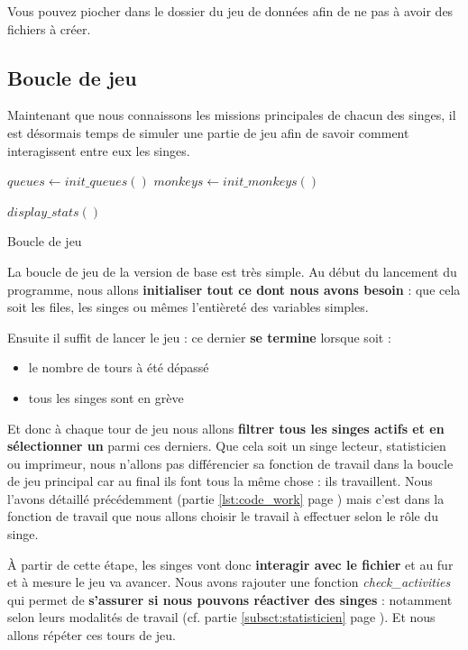 \documentclass{article}
\begin{document}
Vous pouvez piocher dans le dossier du jeu de données  afin de ne pas à avoir des fichiers à créer.


\subsection{Boucle de jeu}
\label{subsct:boucle_jeu}

Maintenant que nous connaissons les missions principales de chacun des singes, il est désormais temps de simuler une partie de jeu afin de savoir comment interagissent entre eux les singes.

\begin{algorithm}[H]
$queues \gets init\_queues()$\;
$monkeys \gets init\_monkeys()$\;

$display\_stats()$\;
\caption{Boucle de jeu}
\end{algorithm}
\label{algo:game}

La boucle de jeu de la version de base est très simple. Au début du lancement du programme, nous allons \textbf{initialiser tout ce dont nous avons besoin} : que cela soit les files, les singes ou mêmes l'entièreté des variables simples.

Ensuite il suffit de lancer le jeu : ce dernier \textbf{se termine} lorsque soit :
\begin{itemize}
    \item le nombre de tours à été dépassé
    \item tous les singes sont en grève
\end{itemize}

Et donc à chaque tour de jeu nous allons \textbf{filtrer tous les singes actifs et en sélectionner un} parmi ces derniers. Que cela soit un singe lecteur, statisticien ou imprimeur, nous n'allons pas différencier sa fonction de travail dans la boucle de jeu principal car au final ils font tous la même chose : ils travaillent. Nous l'avons détaillé précédemment (partie \ref{lst:code_work} page \pageref{lst:code_work}) mais c'est dans la fonction de travail que nous allons choisir le travail à effectuer selon le rôle du singe.

À partir de cette étape, les singes vont donc \textbf{interagir avec le fichier} et au fur et à mesure le jeu va avancer. Nous avons rajouter une fonction \textit{check\_activities} qui permet de \textbf{s'assurer si nous pouvons réactiver des singes} : notamment selon leurs modalités de travail (cf. partie \ref{subsct:statisticien} page \pageref{subsct:statisticien}). Et nous allons répéter ces tours de jeu.
\end{document}
